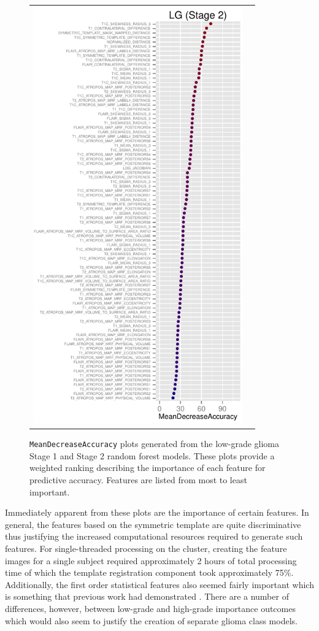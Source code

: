 \documentclass[final,5p,times,twocolumn]{elsarticle}
\begin{document}
\begin{figure}
{\begin{tabular}{cc}
  \includegraphics[width=90mm]{Figures/BRATS_LG_MAP_MRF.pdf} \\
  \end{tabular}
  }
  \caption{{\tt MeanDecreaseAccuracy} plots generated from the low-grade glioma
  Stage 1 and Stage 2 random forest models.  These plots provide a weighted 
  ranking describing the importance of each feature for predictive accuracy.
  Features are listed from most to least important.
  }
  \label{fig:lgimportance}
\end{figure}

Immediately apparent from these plots are the importance of certain features.
In general, the features based on the symmetric template are quite
discriminative thus justifying the increased computational 
resources required to generate such features.  For single-threaded processing
on the cluster, creating the feature images for a single subject required 
approximately 2 hours of total processing time of which the template registration 
component took approximately 75\%.  Additionally, the first order 
statistical features also seemed fairly important which is something that
previous work had demonstrated \citep[e.g.][]{bauer2012,zikic2012}.
There are a number of differences, however, between low-grade and high-grade 
importance outcomes which would also seem to justify the creation of separate
glioma class models.
\end{document}

